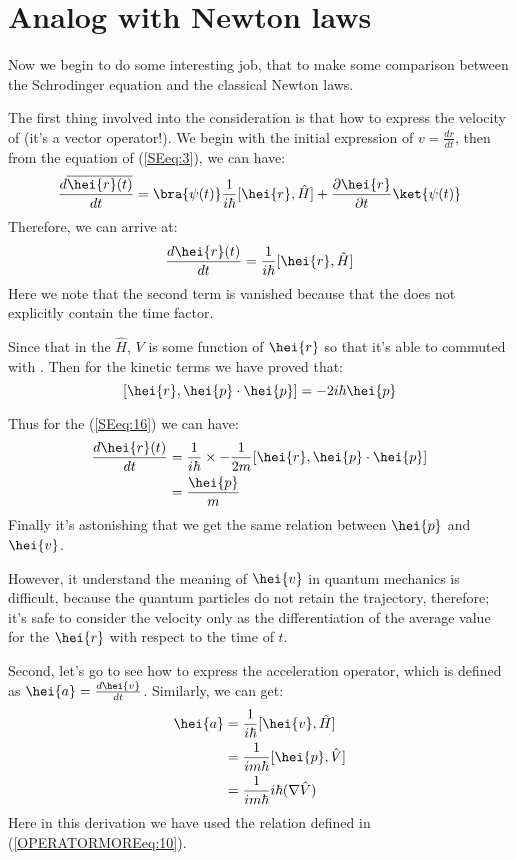 \section{Analog with Newton laws}
%
%
%
Now we begin to do some interesting job, that to make some
comparison between the Schrodinger equation and the classical Newton
laws.

The first thing involved into the consideration is that how to
express the velocity of  (it's a vector operator!). We begin
with the initial expression of $v = \frac{dr}{dt}$, then from the
equation of (\ref{SEeq:3}), we can have:
\begin{equation}\label{}
\frac{d \overline{\hei{r}(t)}}{dt} =
\bra{\psi(t)}\frac{1}{i\hbar}[\hei{r},\hat{H}]+\frac{\partial\hei{r}}{\partial
t}\ket{\psi(t)}
\end{equation}
Therefore, we can arrive at:
\begin{equation}\label{SEeq:16}
\frac{d \hei{r}(t)}{dt} = \frac{1}{i\hbar}[\hei{r},\hat{H}]
\end{equation}
Here we note that the second term is vanished because that the
 does not explicitly contain the time factor.

Since that in the $\hat{H}$, $V$ is some function of $\hei{r}$ so
that it's able to commuted with . Then for the kinetic terms
we have proved that:
\begin{equation}\label{}
[\hei{r}, \hei{p}\cdot\hei{p}] =-2i\hbar\hei{p}
\end{equation}

Thus for the (\ref{SEeq:16}) we can have:
\begin{align}\label{}
\frac{d \hei{r}(t)}{dt} &=
\frac{1}{i\hbar}\times-\frac{1}{2m}[\hei{r}, \hei{p}\cdot\hei{p}]
\nonumber \\
&=\frac{\hei{p}}{m}
\end{align}
Finally it's astonishing that we get the same relation between
$\hei{p}$ and $\hei{v}$.

However, it understand the meaning of $\hei{v}$ in quantum mechanics
is difficult, because the quantum particles do not retain the
trajectory, therefore; it's safe to consider the velocity only as
the differentiation of the average value for the $\hei{r}$ with
respect to the time of $t$.

Second, let's go to see how to express the acceleration operator,
which is defined as $\hei{a} = \frac{d\hei{v}}{dt}$. Similarly, we
can get:
\begin{align}\label{}
\hei{a} &= \frac{1}{i\hbar}[\hei{v},\hat{H}] \nonumber \\
&= \frac{1}{im\hbar}[\hei{p},\hat{V}] \nonumber \\
&=\frac{1}{im\hbar} i\hbar (\nabla\hat{V})
\end{align}
Here in this derivation we have used the relation defined in
(\ref{OPERATORMOREeq:10}).

